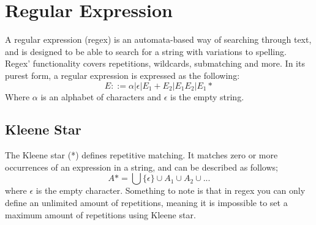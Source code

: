 \documentclass[11pt,twoside,a4paper]{article}
\begin{document}
\section{Regular Expression}
A regular expression (regex) is an automata-based way of searching through text, 
and is designed to be able to search for a string with variations to spelling. 
Regex' functionality covers repetitions, wildcards, submatching and more. In 
its purest form, a regular expression is expressed as the following: 
$$E ::= \alpha | \epsilon | E_1 + E_2 | E_1E_2 | E_1*$$
Where $\alpha$ is an alphabet of characters and $\epsilon$ is the empty string.

\subsection{Kleene Star}
The Kleene star (*) defines repetitive matching. It matches zero 
or more occurrences of an expression in a string, and can be described as follows;
$$A* = \bigcup \{\epsilon\}\cup A_1\cup A_2\cup ...$$
where $\epsilon$ is the empty character. Something to note is that in regex you 
can only define an unlimited amount of repetitions, meaning it is impossible to 
set a maximum amount of repetitions using Kleene star.
\subsection{}
\end{document}
